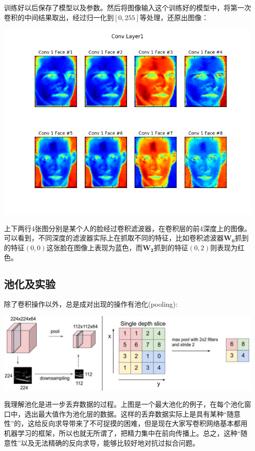 \documentclass[12pt]{article}
\begin{document}
训练好以后保存了模型以及参数。然后将图像输入这个训练好的模型中，将第一次卷积的中间结果取出，经过归一化到$[0, 255]$等处理，还原出图像：\\

\begin{center}
\includegraphics[width=0.8\linewidth]{../image/conv1.png}
\end{center}

上下两行4张图分别是某个人的脸经过卷积滤波器，在卷积层的前4深度上的图像。可以看到，不同深度的滤波器实际上在抓取不同的特征，比如卷积滤波器$\mathbf{W_0}$抓到的特征$(0, 0)$这张脸在图像上表现为蓝色，而$\mathbf{W_2}$抓到的特征$(0, 2)$则表现为红色。

\subsection{池化及实验}

除了卷积操作以外，总是成对出现的操作有池化(pooling):

\begin{center}
\includegraphics[width=0.8\linewidth]{./fig14.jpg}
\end{center}

我理解池化是进一步丢弃数据的过程。上图是一个最大池化的例子，在每个池化窗口中，选出最大值作为池化层的数据。这样的丢弃数据实际上是具有某种“随意性”的，这给反向求导带来了不可捉摸的困难，但是现在大家写卷积网络基本都用机器学习的框架，所以也就无所谓了，把精力集中在前向传播上。总之，这种“随意性”以及无法精确的反向求导，能够比较好地对抗过拟合问题。\\
\end{document}
